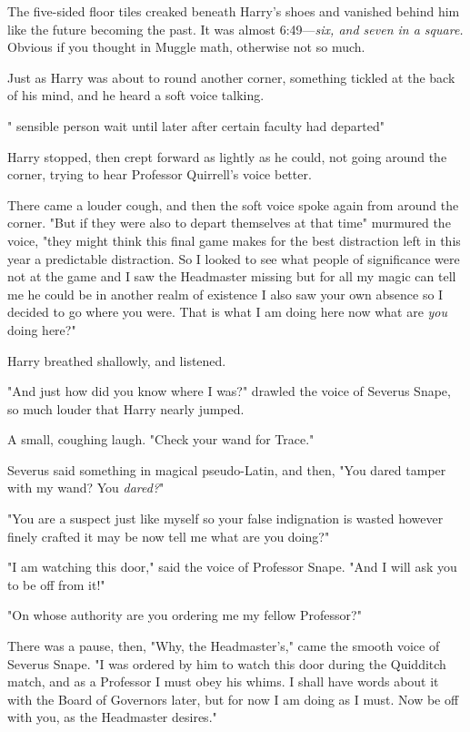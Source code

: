 The five-sided floor tiles creaked beneath Harry's shoes and vanished behind
him like the future becoming the past. It was almost 6:49---\emph{six, and seven
in a square.} Obvious if you thought in Muggle math, otherwise not so much.

Just as Harry was about to round another corner, something tickled at the back
of his mind, and he heard a soft voice talking.

"{\el} sensible person{\el} wait until later{\el} after certain faculty
had departed{\el}"

Harry stopped, then crept forward as lightly as he could, not going around the
corner, trying to hear Professor Quirrell's voice better.

There came a louder cough, and then the soft voice spoke again from around the
corner. "But if they were also{\el} to depart themselves{\el} at that
time{\el}" murmured the voice, "they might think{\el} this final
game{\el} makes for the best distraction{\el} left in this year{\el} a
predictable distraction. So I looked{\el} to see what people of
significance{\el} were not at the game{\el} and I saw the Headmaster
missing{\el} but for all my magic can tell me{\el} he could be in
another{\el} realm of existence{\el} I also saw your own absence{\el}
so I decided to go{\el} where you were. That is what I am doing here{\el}
now{\el} what are \emph{you} doing here?"

Harry breathed shallowly, and listened.

"And just how did you know where I was?" drawled the voice of Severus Snape, so
much louder that Harry nearly jumped.

A small, coughing laugh. "Check your wand{\el} for Trace."

Severus said something in magical pseudo-Latin, and then, "You dared tamper
with my wand? You \emph{dared?}"

"You are a suspect{\el} just like myself{\el} so your false indignation
is wasted{\el} however finely crafted it may be{\el} now tell me{\el}
what are you doing?"

"I am watching this door," said the voice of Professor Snape. "And I will ask
you to be off from it!"

"On whose authority{\el} are you ordering me{\el} my fellow Professor?"

There was a pause, then, "Why, the Headmaster's," came the smooth voice of
Severus Snape. "I was ordered by him to watch this door during the Quidditch
match, and as a Professor I must obey his whims. I shall have words about it
with the Board of Governors later, but for now I am doing as I must. Now be off
with you, as the Headmaster desires."


